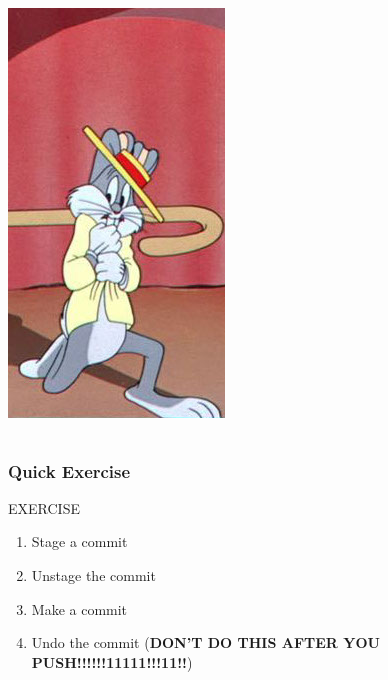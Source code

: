 \documentclass{beamer}
\begin{document}
\begin{frame}[fragile]
\begin{columns}
\includegraphics[width=\textwidth]{the-hook.jpg}
\end{columns}
\end{frame}

\begin{frame}[fragile]
\frametitle{Quick Exercise}
    \begin{block}{EXERCISE}
        \begin{enumerate}
        \item Stage a commit
        \item Unstage the commit
        \item Make a commit
        \item Undo the commit (\textbf{DON'T DO THIS AFTER YOU PUSH!!!!!!11111!!!11!!})
        \end{enumerate}
    \end{block}

\end{frame}
\end{document}
